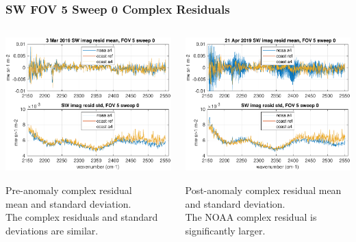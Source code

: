 \documentclass[10pt]{beamer}
\begin{document}
\begin{frame}
\frametitle{SW FOV 5 Sweep 0 Complex Residuals}
\begin{columns}[t]
\begin{column}{0.5\textwidth}
  \begin{centering}
  \includegraphics[width=\textwidth]{figures/SW_MW_good_imag_fov5_sd0.pdf}
  \end{centering}\vspace{3mm}
  Pre-anomaly complex residual \\mean and standard deviation.  \\The
  complex residuals and standard deviations are similar.

\end{column}
\begin{column}{0.5\textwidth}  
  \begin{centering}
  \includegraphics[width=\textwidth]{figures/SW_MW_fail_imag_fov5_sd0.pdf}
  \end{centering}\vspace{3mm}
  Post-anomaly complex residual mean and standard deviation.  \\The
  NOAA complex residual is significantly larger.


\end{column}
\end{columns}
\end{frame}
\end{document}
